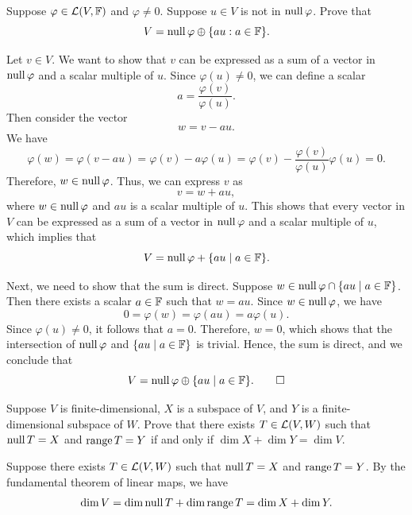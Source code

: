 \begin{exc}
\begin{exercise}
Suppose $\varphi\in\mathcal{L}(V,\mathbb{F})$ and $\varphi\ne0$. Suppose $u\in V$ is not in
$\operatorname{null}\varphi$. Prove that
\[ V=\operatorname{null}\varphi\oplus\{au : a\in\mathbb{F}\}. \]
\end{exercise}
\begin{solution}
Let $v\in V$. We want to show that $v$ can be expressed as a sum of a vector in
$\operatorname{null}\varphi$ and a scalar multiple of $u$. Since $\varphi(u)\ne0$, we can
define a scalar
\[ a=\frac{\varphi(v)}{\varphi(u)}. \]
Then consider the vector
\[ w=v-au. \]
We have
\[ \varphi(w)=\varphi(v-au)=\varphi(v)-a\varphi(u)
   =\varphi(v)-\frac{\varphi(v)}{\varphi(u)}\varphi(u)=0. \]
Therefore, $w\in\operatorname{null}\varphi$. Thus, we can express $v$ as
\[ v=w+au, \]
where $w\in\operatorname{null}\varphi$ and $au$ is a scalar multiple of $u$. This shows that
every vector in $V$ can be expressed as a sum of a vector in $\operatorname{null}\varphi$ and a
scalar multiple of $u$, which implies that
\[ V=\operatorname{null}\varphi+\{au\mid a\in\mathbb{F}\}. \]

Next, we need to show that the sum is direct. Suppose
$w\in\operatorname{null}\varphi\cap\{au\mid a\in\mathbb{F}\}$. Then there exists a scalar $a\in\mathbb{F}$
such that $w=au$. Since $w\in\operatorname{null}\varphi$, we have
\[ 0=\varphi(w)=\varphi(au)=a\varphi(u). \]
Since $\varphi(u)\ne0$, it follows that $a=0$. Therefore, $w=0$, which shows
that the intersection of $\operatorname{null}\varphi$ and $\{au\mid a\in\mathbb{F}\}$ is trivial.
Hence, the sum is direct, and we conclude that
\[ V=\operatorname{null}\varphi\oplus\{au\mid a\in\mathbb{F}\}. \qedhere \]
\end{solution}

\begin{exercise}
Suppose $V$ is finite-dimensional, $X$ is a subspace of $V$, and $Y$ is a
finite-dimensional subspace of $W$. Prove that there exists $T\in\mathcal{L}(V,W)$
such that $\operatorname{null} T=X$ and $\operatorname{range} T=Y$ if and only if $\dim X+\dim Y=\dim V$.
\end{exercise}
\begin{solution}
Suppose there exists $T\in\mathcal{L}(V,W)$ such that $\operatorname{null} T=X$ and $\operatorname{range} T=Y$. By
the fundamental theorem of linear maps, we have
\[ \operatorname{dim} V=\operatorname{dim}\operatorname{null} T+\operatorname{dim}\operatorname{range} T=\operatorname{dim} X+\operatorname{dim} Y. \]


\end{solution}
\end{exc}
